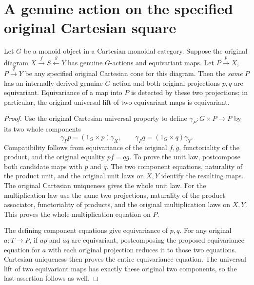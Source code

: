 \section{A genuine action on the specified original Cartesian square}
\label{sec:pullback-cone-monoid-action}

\begin{theorem}
\label{thm:pullback-cone-monoid-action}
\leanok
Let $G$ be a monoid object in a Cartesian monoidal category.
Suppose the original diagram $X\xrightarrow f S\xleftarrow gY$
has genuine $G$-actions and equivariant maps.
Let $P\xrightarrow pX$, $P\xrightarrow qY$ be any specified
original Cartesian cone for this diagram. Then the \emph{same}
$P$ has an internally derived genuine $G$-action and both
original projections $p,q$ are equivariant. Equivariance of a
map into $P$ is detected by these two projections; in particular,
the original universal lift of two equivariant maps is equivariant.
\end{theorem}

\begin{proof}
Use the original Cartesian universal property to define
$\gamma_P:G\times P\to P$ by its two whole components
\[
 \gamma_Pp=(1_G\times p)\gamma_X,
 \qquad
 \gamma_Pq=(1_G\times q)\gamma_Y.
\]
Compatibility follows from equivariance of the original $f,g$,
functoriality of the product, and the original equality $pf=qg$.
To prove the unit law, postcompose both candidate maps with $p$
and $q$. The two component equations, naturality of the product
unit, and the original unit laws on $X,Y$ identify the resulting
maps. The original Cartesian uniqueness gives the whole unit law.
For the multiplication law use the same two projections,
naturality of the product associator, functoriality of products,
and the original multiplication laws on $X,Y$. This proves the
whole multiplication equation on $P$.

The defining component equations give equivariance of $p,q$.
For any original $a:T\to P$, if $ap$ and $aq$ are equivariant,
postcomposing the proposed equivariance equation for $a$ with
each original projection reduces it to those two equations.
Cartesian uniqueness then proves the entire equivariance equation.
The universal lift of two equivariant maps has exactly these
original two components, so the last assertion follows as well.
\end{proof}
